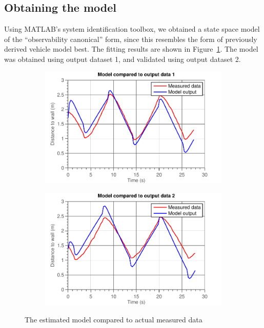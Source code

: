 \documentclass[11pt,titlepage]{report}
\begin{document}
\subsection{Obtaining the model}
Using MATLAB's system identification toolbox, we obtained a state space model of the ``observability canonical'' form, since this resembles the form of previously derived vehicle model best. The fitting results are shown in Figure~\ref{fig:ass1-fit}. The model was obtained using output dataset \num{1}, and validated using output dataset \num{2}.

\begin{figure}[H]
	\begin{subfigure}{.5\textwidth}
		\begin{center}
			\includegraphics[width=\linewidth]{resource/model-fit1.pdf}
		\end{center}
	\end{subfigure}
	\begin{subfigure}{.5\textwidth}
		\begin{center}
			\includegraphics[width=\linewidth]{resource/model-fit2.pdf}
		\end{center}
	\end{subfigure}
	\caption{The estimated model compared to actual measured data}
	\label{fig:ass1-fit}
\end{figure}
\end{document}
